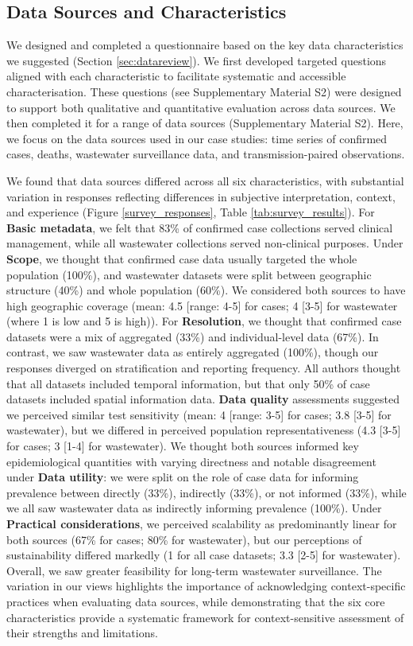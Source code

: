 \documentclass{article}
\begin{document}
\subsection{Data Sources and Characteristics}

We designed and completed a questionnaire based on the key data characteristics we suggested (Section \ref{sec:datareview}). We first developed targeted questions aligned with each characteristic to facilitate systematic and accessible characterisation. These questions (see Supplementary Material S2) were designed to support both qualitative and quantitative evaluation across data sources. We then completed it for a range of data sources (Supplementary Material S2). Here, we focus on the data sources used in our case studies: time series of confirmed cases, deaths, wastewater surveillance data, and transmission-paired observations.

We found that data sources differed across all six characteristics, with substantial variation in responses reflecting differences in subjective interpretation, context, and experience (Figure \ref{survey_responses}, Table \ref{tab:survey_results}). For \textbf{Basic metadata}, we felt that 83\% of confirmed case collections served clinical management, while all wastewater collections served non-clinical purposes. Under \textbf{Scope}, we thought that confirmed case data usually targeted the whole population (100\%),  and wastewater datasets were split between geographic structure (40\%) and whole population (60\%). We considered both sources to have high geographic coverage (mean: 4.5 [range: 4-5] for cases; 4 [3-5] for wastewater (where 1 is low and 5 is high)). For \textbf{Resolution}, we thought that confirmed case datasets were a mix of aggregated (33\%) and individual-level data (67\%). In contrast, we saw wastewater data as entirely aggregated (100\%), though our responses diverged on stratification and reporting frequency. All authors thought that all datasets included temporal information, but that only 50\% of case datasets included spatial information data. \textbf{Data quality} assessments suggested we perceived similar test sensitivity (mean: 4 [range: 3-5] for cases; 3.8 [3-5] for wastewater), but we differed in perceived population representativeness (4.3 [3-5] for cases; 3 [1-4] for wastewater). We thought both sources informed key epidemiological quantities with varying directness and notable disagreement under \textbf{Data utility}: we were split on the role of case data for informing prevalence between directly (33\%), indirectly (33\%), or not informed (33\%), while we all saw wastewater data as indirectly informing prevalence (100\%). Under \textbf{Practical considerations}, we perceived scalability as predominantly linear for both sources (67\% for cases; 80\% for wastewater), but our perceptions of sustainability differed markedly (1 for all case datasets; 3.3 [2-5] for wastewater). Overall, we saw greater feasibility for long-term wastewater surveillance. The variation in our views highlights the importance of acknowledging context-specific practices when evaluating data sources, while demonstrating that the six core characteristics provide a systematic framework for context-sensitive assessment of their strengths and limitations.
\end{document}
